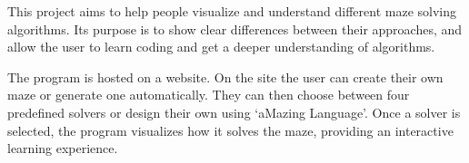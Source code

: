 This project aims to help people visualize and understand different maze solving algorithms. Its purpose is to show clear differences between their approaches, and allow the user to learn coding and get a deeper understanding of algorithms.

The program is hosted on a website. On the site the user can create their own maze or generate one automatically. They can then choose between four predefined solvers or design their own using ‘aMazing Language’. Once a solver is selected, the program visualizes how it solves the maze, providing an interactive learning experience.
